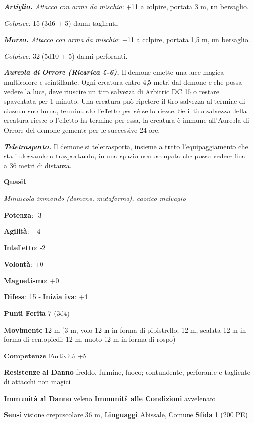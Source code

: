 \begin{multicols}{2}
\emph{\textbf{Artiglio.} Attacco con arma da mischia}: +11 a colpire,
portata 3 m, un bersaglio.

\emph{Colpisce:} 15 (3d6 + 5) danni taglienti.

\emph{\textbf{Morso.} Attacco con arma da mischia}: +11 a colpire,
portata 1,5 m, un bersaglio.

\emph{Colpisce:} 32 (5d10 + 5) danni perforanti.

\emph{\textbf{Aureola di Orrore (Ricarica 5-6).}} Il demone emette una
luce magica multicolore e scintillante. Ogni creatura entro 4,5 metri
dal demone e che possa vedere la luce, deve riuscire un tiro salvezza di Arbitrio DC 15 o restare spaventata per 1 minuto. Una creatura può
ripetere il tiro salvezza al termine di ciascun suo turno, terminando
l'effetto per sé se lo riesce. Se il tiro salvezza della creatura riesce
o l'effetto ha termine per essa, la creatura è immune all'Aureola di
Orrore del demone gemente per le successive 24 ore.

\emph{\textbf{Teletrasporto.}} Il demone si teletrasporta, insieme a
tutto l'equipaggiamento che sta indossando o trasportando, in uno spazio
non occupato che possa vedere fino a 36 metri di distanza.



\textbf{Quasit}

\emph{Minuscola immondo (demone, mutaforma), caotico malvagio}

\textbf{Potenza}: -3

\textbf{Agilità}: +4

\textbf{Intelletto}: -2

\textbf{Volontà}: +0

\textbf{Magnetismo}: +0

\textbf{Difesa}: 15 - \textbf{Iniziativa}: +4

\textbf{Punti Ferita} 7 (3d4)

\textbf{Movimento} 12 m (3 m, volo 12 m in forma di pipistrello; 12 m,
scalata 12 m in forma di centopiedi; 12 m, nuoto 12 m in forma di rospo)

\textbf{Competenze} Furtività +5

\textbf{Resistenze al Danno} freddo, fulmine, fuoco; contundente,
perforante e tagliente di attacchi non magici

\textbf{Immunità al Danno} veleno \textbf{Immunità alle Condizioni}
avvelenato

\textbf{Sensi} visione crepuscolare 36 m, 
\textbf{Linguaggi} Abissale, Comune \textbf{Sfida} 1 (200 PE)


\end{multicols}
